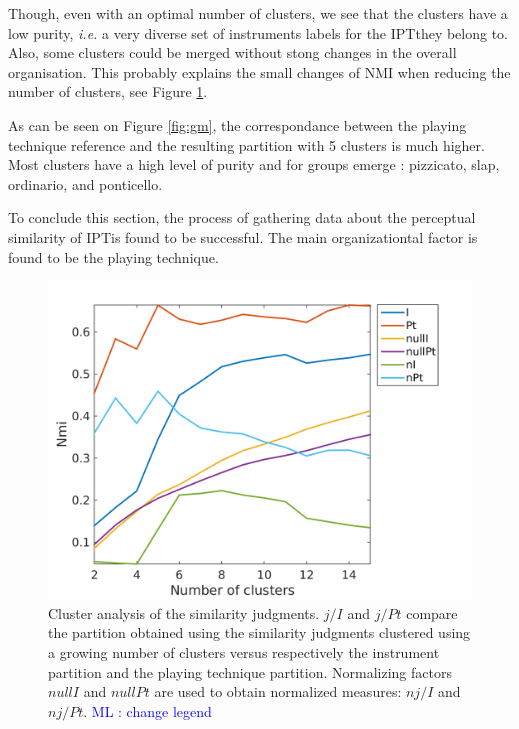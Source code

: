 \documentclass{article}
\newcommand{\ipt}{IPT}
\newcommand{\ml}[1]{\textcolor{blue}{ML : #1}}
\begin{document}
Though, even with an optimal number of clusters, we see that the clusters have  a low purity, \textit{i.e.} a very diverse set of instruments labels for the \ipt they belong to. Also, some clusters could be merged without stong changes in the overall organisation. This probably explains the small changes of NMI when reducing the number of clusters, see Figure \ref{fig:clusters}.

As can be seen on Figure \ref{fig:gm}, the correspondance between the playing technique reference and the resulting partition with 5 clusters is much higher. Most clusters have a high level of purity and for groups emerge : pizzicato, slap, ordinario, and ponticello.

To conclude this section, the process of gathering data about the perceptual similarity of \ipt is found to be successful. The main organizationtal factor is found to be the playing technique.

\begin{figure}
\center
\includegraphics[width = \textwidth]{figures/clusterAnalysis.png}
\caption{Cluster analysis of the similarity judgments. $j/I$ and $j/Pt$ compare the partition obtained using the similarity judgments clustered using a growing number of clusters versus respectively the instrument partition and the playing technique partition. Normalizing factors $nullI$ and $nullPt$ are used to obtain normalized measures: $nj/I$ and $nj/Pt$. \ml{change legend}}
\label{fig:clusters}
\end{figure}
\end{document}
